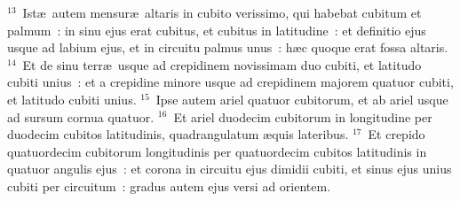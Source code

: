 ${}^{13}$~Ist\ae\ autem mensur\ae\ altaris in cubito verissimo, qui habebat cubitum et palmum~: in sinu ejus erat cubitus, et cubitus in latitudine~: et definitio ejus usque ad labium ejus, et in circuitu palmus unus~: h\ae c quoque erat fossa altaris.
${}^{14}$~Et de sinu terr\ae\ usque ad crepidinem novissimam duo cubiti, et latitudo cubiti unius~: et a crepidine minore usque ad crepidinem majorem quatuor cubiti, et latitudo cubiti unius.
${}^{15}$~Ipse autem ariel quatuor cubitorum, et ab ariel usque ad sursum cornua quatuor.
${}^{16}$~Et ariel duodecim cubitorum in longitudine per duodecim cubitos latitudinis, quadrangulatum \ae quis lateribus.
${}^{17}$~Et crepido quatuordecim cubitorum longitudinis per quatuordecim cubitos latitudinis in quatuor angulis ejus~: et corona in circuitu ejus dimidii cubiti, et sinus ejus unius cubiti per circuitum~: gradus autem ejus versi ad orientem.


